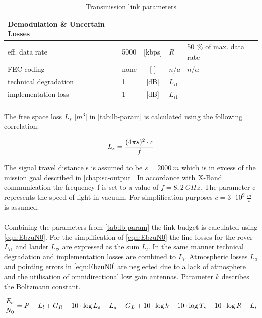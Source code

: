 \begin{table}[h]
\begin{tabular}{llclll}
Demodulation \& Uncertain Losses &        &            &               &                              &  \\ \hline\hline
eff. data rate                   & 5000   & {[}kbps{]} & ${R}$         & 50 \% of max. data rate                            &  \\
FEC coding                       & none   & {[}-{]}    & ${n/a}$       &  ${n/a}$                            &  \\
technical degradation            & 1      & {[}dB{]}   & ${L}_{i1}$    & \cite{FLP_Exercise}                          &  \\
implementation loss              & 1      & {[}dB{]}   & ${L}_{i1}$	   & \cite{FLP_Exercise}                          &  \\
                                 &        &            &               &                              & 
\end{tabular}
\caption{Transmission link parameters}
\label{tab:lb-param}
\end{table}

The free space loss ${L}_{s}$ [$m^3$] in \autoref{tab:lb-param} is calculated using the following correlation. 

\begin{equation}
	\centering
		{L}_{s} = {\frac{(4 \pi s)^2 \cdot c}{f}}
	\label{eqn:Ls}
\end{equation}

The signal travel distance {s} is assumed to be $s = 2000\ m$ which is in excess of the mission goal described in \autoref{chap:sc-output}. In accordance with X-Band communication the frequency {f} is set to a value of $f = 8,2\ GHz$. The parameter c represents the speed of light in vacuum. For simplification purposes $c = 3 \cdot 10^9\ \frac{m}{s}$ is assumed. \\ \\   
Combining the parameters from \autoref{tab:lb-param} the link budget is calculated using \autoref{eqn:EbzuN0}. For the simplification of \autoref{eqn:EbzuN0} the line losses for the rover ${L}_{l1}$ and lander ${L}_{l2}$ are expressed as the sum ${L}_{l}$. In the same manner technical degradation and implementation losses are combined to ${L}_{i}$. Atmospheric losses ${L}_{a}$ and pointing errors in \autoref{eqn:EbzuN0} are neglected due to a lack of atmosphere and the utilisation of omnidirectional low gain antennas. Parameter ${k}$ describes the Boltzmann constant.   

\begin{equation}
  \centering
		{\frac{{E}_{b}}{{N}_{0}}} = {P} - {L}_{l} + {G}_{R} - {10\cdot \log{{L}_{s}}} - {L}_{a} + {G}_{L} + {10\cdot \log{k}} - {10\cdot \log{{T}_{s}}} - {10\cdot \log{{R}}} - {L}_{i}
	\label{eqn:EbzuN0}
\end{equation}


